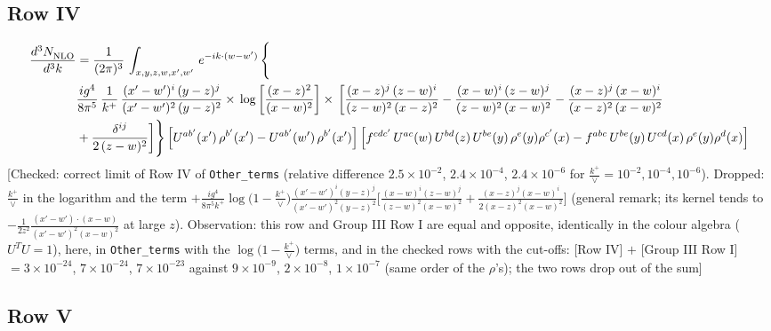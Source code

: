 \documentclass[9pt]{article}
\numberwithin{equation}{section}
\begin{document}
\subsection{Row IV}
\begin{align}
    \frac{d^{3}N_{\rm NLO}^{\rm}}{d^{3}k}  & =   \frac{1}{(2\pi)^{3}}\,
    \int_{x,y,z,w,x',w'}\,e^{-ik\cdot (w-w^\prime)}\,\Bigg\{\notag \\
& \frac{ig^{4}}{8\pi^{5}}\,\frac{1}{k^{+}}\,\frac{(x'-w')^{i}\,(y-z)^{j}}{(x'-w')^{2}\,(y-z)^{2}}\times\,\log{\left[\frac{(x-z)^{2}}{(x-w)^{2}}\right]}\times\, \bigg[\frac{(x-z)^{j}\,(z-w)^{i}}{(z-w)^{2}\,(x-z)^{2}} -\frac{(x-w)^{i}\,(z-w)^{j}}{(z-w)^{2}\,(x-w)^{2}}-\frac{(x-z)^{j}\,(x-w)^{i}}{(x-z)^{2}\,(x-w)^{2}}\notag \\ & +\frac{\delta^{ij}}{2\,(z-w)^{2}}\bigg]\Bigg\} \left[U^{ab'}(x')\,\rho^{b'}(x')-U^{ab'}(w')\,\rho^{b'}(x')\right] \left[f^{cdc'}\,U^{ac}(w)\,U^{bd}(z)\,U^{be}(y)\,\rho^{e}(y)\rho^{c'}(x)-f^{abc}\,U^{be}(y)\,U^{cd}(x)\,\rho^{e}(y)\rho^{d}(x)\right]
\end{align} {\color{red}[Checked: correct limit of Row IV of \texttt{Other\_terms} (relative difference $2.5\times10^{-2}$, $2.4\times10^{-4}$, $2.4\times10^{-6}$ for $\frac{k^{+}}{\vee}=10^{-2},10^{-4},10^{-6}$). Dropped: $\frac{k^{+}}{\vee}$ in the logarithm and the term $+\frac{ig^{4}}{8\pi^{5}k^{+}}\log\big(1-\frac{k^{+}}{\vee}\big)\frac{(x'-w')^{i}(y-z)^{j}}{(x'-w')^{2}(y-z)^{2}}\big[\frac{(x-w)^{i}(z-w)^{j}}{(z-w)^{2}(x-w)^{2}}+\frac{(x-z)^{j}(x-w)^{i}}{2(x-z)^{2}(x-w)^{2}}\big]$ (general remark; its kernel tends to $-\frac{1}{2z^{2}}\frac{(x'-w')\cdot(x-w)}{(x'-w')^{2}(x-w)^{2}}$ at large $z$). Observation: this row and Group III Row I are equal and opposite, identically in the colour algebra ($U^{T}U=1$), here, in \texttt{Other\_terms} with the $\log\big(1-\frac{k^{+}}{\vee}\big)$ terms, and in the checked rows with the cut-offs: [Row IV] $+$ [Group III Row I] $=3\times10^{-24}$, $7\times10^{-24}$, $7\times10^{-23}$ against $9\times10^{-9}$, $2\times10^{-8}$, $1\times10^{-7}$ (same order of the $\rho$'s); the two rows drop out of the sum]}\par\noindent
\subsection{Row V}
\end{document}
